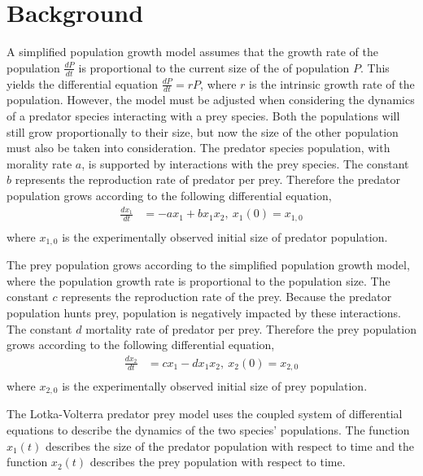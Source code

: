 \documentclass[12pt]{article}   %
\theoremstyle{definition}
\numberwithin{equation}{section}
\begin{document}
\section{Background} \label{APPM2360proj01sec01}
\quad A simplified population growth model assumes that the growth rate of the population $\frac{dP}{dt}$ is proportional to the current size of the of population $P$. This yields the differential equation $\frac{dP}{dt}=rP$, where $r$ is the intrinsic growth rate of the population. However, the model must be adjusted when considering the dynamics of a predator species interacting with a prey species. Both the populations will still grow proportionally to their size, but now the size of the other population must also be taken into consideration. The predator species population, with morality rate $a$, is supported by interactions with the prey species. The constant $b$ represents the reproduction rate of predator per prey. Therefore the predator population grows according to the following differential equation, 
\begin{align*}
%
\frac{dx_1}{dt} & = -ax_1 + bx_1x_2 ,\ x_1(0) = x_{1,0}\\
%
\end{align*}
where $x_{1,0}$ is the experimentally observed initial size of predator population. 

\quad The prey population grows according to the simplified population growth model, where the population growth rate is proportional to the population size. The constant $c$ represents the reproduction rate of the prey. Because the predator population hunts prey, population is negatively impacted by these interactions. The constant $d$ mortality rate of predator per prey. Therefore the prey population grows according to the following differential equation,
\begin{align*}
%
\frac{dx_2}{dt} & = cx_1 - dx_1x_2 ,\ x_2(0) = x_{2,0}\\
%
\end{align*}
where $x_{2,0}$ is the experimentally observed initial size of prey population. 

The Lotka-Volterra predator prey model uses the coupled system of differential equations to describe the dynamics of the two species' populations. The function $x_1(t)$ describes the size of the predator population with respect to time and the function $x_2(t)$ describes the prey population with respect to time. 

\setcounter{page}{4}
\end{document}
